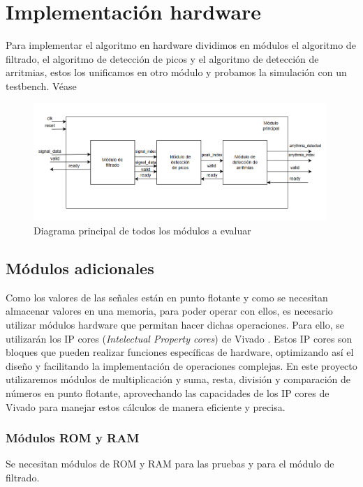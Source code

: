 \chapter{Implementación hardware}

Para implementar el algoritmo en hardware dividimos en módulos el algoritmo de filtrado, el algoritmo
de detección de picos y el algoritmo de detección de arritmias, estos los unificamos en otro módulo 
y probamos la simulación con un testbench. Véase 

\begin{figure}[h!]
    \centering
    \includegraphics[width=0.99\textwidth]{./Images/img_res_experimentales/diagramaGeneral.png}
    \caption{Diagrama principal de todos los módulos a evaluar}
    \label{fig:diagramaGeneral}
\end{figure} 




\section{Módulos adicionales} 

Como los valores de las señales están en punto flotante y como se necesitan almacenar valores en una memoria, para poder operar con ellos, es necesario utilizar módulos hardware que permitan hacer dichas operaciones. Para ello, se utilizarán los IP cores (\textit{Intelectual Property cores}) de Vivado \cite{xilinx_ip_cores}. Estos IP cores son bloques que pueden realizar funciones específicas de hardware, optimizando así el diseño y facilitando la implementación de operaciones complejas. En este proyecto utilizaremos módulos de multiplicación y suma, resta, división y comparación de números en punto flotante, aprovechando las capacidades de los IP cores de Vivado para manejar estos cálculos de manera eficiente y precisa.
\subsection{Módulos ROM y RAM}
 Se necesitan módulos de ROM y RAM para las pruebas y para el módulo de filtrado.

